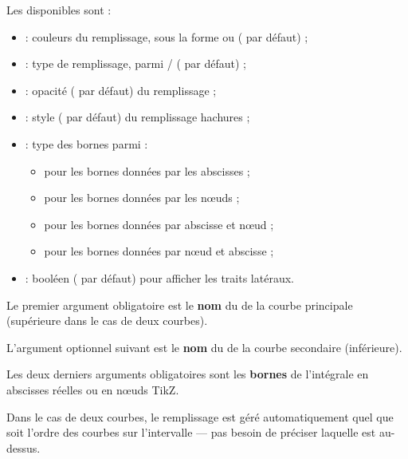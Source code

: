\documentclass[11pt,a4paper]{ltxdoc}
\begin{document}
Les \MontreCode{[clés]} disponibles sont :

\begin{itemize}
  \item {} : couleurs du remplissage, sous la forme  ou  ( par défaut) ;
  \item {} : type de remplissage, parmi / ( par défaut) ;
  \item {} : opacité ( par défaut) du remplissage ;
  \item {} : style ( par défaut) du remplissage hachures ;
  \item {} : type des bornes parmi :
  \begin{itemize}
    \item {} pour les bornes données par les abscisses ;
    \item {} pour les bornes données par les nœuds ;
    \item {} pour les bornes données par abscisse et nœud ;
    \item {} pour les bornes données par nœud et abscisse ;
  \end{itemize}
  \item {} : booléen ( par défaut) pour afficher les traits latéraux.
\end{itemize}

\smallskip

Le premier argument obligatoire est le \textbf{nom} du  de la courbe principale (supérieure dans le cas de deux courbes).

\smallskip

L'argument optionnel suivant est le \textbf{nom} du  de la courbe secondaire (inférieure).

\smallskip

Les deux derniers arguments obligatoires sont les \textbf{bornes} de l'intégrale en abscisses réelles ou en nœuds TikZ.

\smallskip

Dans le cas de deux courbes, le remplissage est géré automatiquement quel que soit l'ordre des courbes sur l'intervalle — pas besoin de préciser laquelle est au-dessus.
\end{document}
